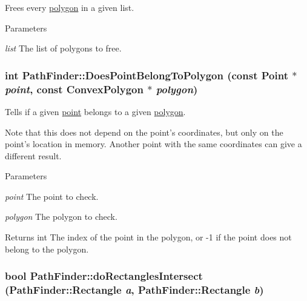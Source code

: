 Frees every \hyperlink{structPathFinder_1_1ConvexPolygon}{polygon} in a given list. 


\begin{DoxyParams}{Parameters}
\item[{\em list}]The list of polygons to free. \end{DoxyParams}
\hypertarget{classPathFinder_ad12ed53e6e67ee4408a757bbca18058d}{
\subsubsection[{DoesPointBelongToPolygon}]{\setlength{\rightskip}{0pt plus 5cm}int PathFinder::DoesPointBelongToPolygon (const {\bf Point} $\ast$ {\em point}, \/  const {\bf ConvexPolygon} $\ast$ {\em polygon})}}
\label{classPathFinder_ad12ed53e6e67ee4408a757bbca18058d}


Tells if a given \hyperlink{structPathFinder_1_1Point}{point} belongs to a given \hyperlink{structPathFinder_1_1ConvexPolygon}{polygon}. 

Note that this does not depend on the point's coordinates, but only on the point's location in memory. Another point with the same coordinates can give a different result.


\begin{DoxyParams}{Parameters}
\item[{\em point}]The point to check. \item[{\em polygon}]The polygon to check. \end{DoxyParams}
\begin{DoxyReturn}{Returns}
int The index of the point in the polygon, or -\/1 if the point does not belong to the polygon. 
\end{DoxyReturn}
\hypertarget{classPathFinder_af0e8090b3bb9516751093f99a7376453}{
\subsubsection[{doRectanglesIntersect}]{\setlength{\rightskip}{0pt plus 5cm}bool PathFinder::doRectanglesIntersect ({\bf PathFinder::Rectangle} {\em a}, \/  {\bf PathFinder::Rectangle} {\em b})}}
\label{classPathFinder_af0e8090b3bb9516751093f99a7376453}


